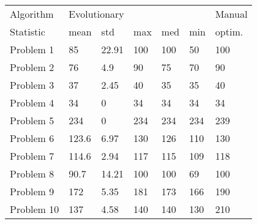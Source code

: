 \begin{tabular}{lllllll}
\toprule
Algorithm & \multicolumn{5}{l}{Evolutionary} & Manual \\
Statistic &         mean &    std &  max &  med &  min & optim. \\
\midrule
Problem 1  &           85 &  22.91 &  100 &  100 &   50 &    100 \\
Problem 2  &           76 &    4.9 &   90 &   75 &   70 &     90 \\
Problem 3  &           37 &   2.45 &   40 &   35 &   35 &     40 \\
Problem 4  &           34 &      0 &   34 &   34 &   34 &     34 \\
Problem 5  &          234 &      0 &  234 &  234 &  234 &    239 \\
Problem 6  &        123.6 &   6.97 &  130 &  126 &  110 &    130 \\
Problem 7  &        114.6 &   2.94 &  117 &  115 &  109 &    118 \\
Problem 8  &         90.7 &  14.21 &  100 &  100 &   69 &    100 \\
Problem 9  &          172 &   5.35 &  181 &  173 &  166 &    190 \\
Problem 10 &          137 &   4.58 &  140 &  140 &  130 &    210 \\
\bottomrule
\end{tabular}
